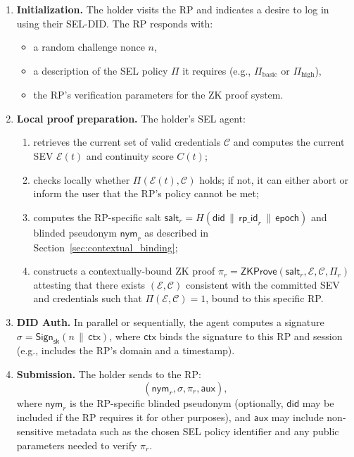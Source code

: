 \documentclass[11pt]{article}
\begin{document}
\begin{enumerate}
  \item \textbf{Initialization.} The holder visits the RP and indicates a desire to log in using their SEL-DID. The RP responds with:
  \begin{itemize}
    \item a random challenge nonce $n$,
    \item a description of the SEL policy $\Pi$ it requires (e.g., $\Pi_{\text{basic}}$ or $\Pi_{\text{high}}$),
    \item the RP's verification parameters for the ZK proof system.
  \end{itemize}
  \item \textbf{Local proof preparation.} The holder's SEL agent:
  \begin{enumerate}
    \item retrieves the current set of valid credentials $\mathcal{C}$ and computes the current SEV $\mathcal{E}(t)$ and continuity score $C(t)$;
    \item checks locally whether $\Pi(\mathcal{E}(t), \mathcal{C})$ holds; if not, it can either abort or inform the user that the RP's policy cannot be met;
    \item computes the RP-specific salt $\mathsf{salt}_r = H(\mathsf{did} \,\|\, \mathsf{rp\_id}_r \,\|\, \mathsf{epoch})$ and blinded pseudonym $\mathsf{nym}_r$ as described in Section~\ref{sec:contextual_binding};
    \item constructs a contextually-bound ZK proof $\pi_r = \textsf{ZKProve}(\mathsf{salt}_r, \mathcal{E}, \mathcal{C}, \Pi_r)$ attesting that there exists $(\mathcal{E}, \mathcal{C})$ consistent with the committed SEV and credentials such that $\Pi(\mathcal{E}, \mathcal{C}) = 1$, bound to this specific RP.
  \end{enumerate}
  \item \textbf{DID Auth.} In parallel or sequentially, the agent computes a signature $\sigma = \textsf{Sign}_{\mathsf{sk}}(n \,\|\, \textsf{ctx})$, where $\textsf{ctx}$ binds the signature to this RP and session (e.g., includes the RP's domain and a timestamp).
  \item \textbf{Submission.} The holder sends to the RP:
  \[
    (\mathsf{nym}_r, \sigma, \pi_r, \textsf{aux}),
  \]
  where $\mathsf{nym}_r$ is the RP-specific blinded pseudonym (optionally, $\mathsf{did}$ may be included if the RP requires it for other purposes), and $\textsf{aux}$ may include non-sensitive metadata such as the chosen SEL policy identifier and any public parameters needed to verify $\pi_r$.

\end{enumerate}
\end{document}
